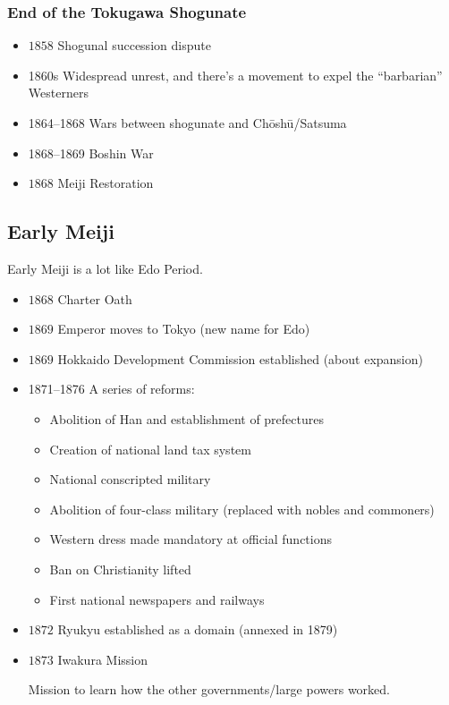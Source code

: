 \documentclass[class=article, crop=false]{standalone}
\begin{document}
  \subsubsection{End of the Tokugawa Shogunate}
  \begin{itemize}
    \item $1858$ Shogunal succession dispute
    \item 1860s Widespread unrest, and there's a movement to expel the ``barbarian'' Westerners
    \item 1864--1868 Wars between shogunate and Ch\=osh\=u/Satsuma
    \item 1868--1869 Boshin War
    \item $1868$ Meiji Restoration
  \end{itemize}
  \subsection{Early Meiji}
  \begin{note}{}
    Early Meiji is a lot like Edo Period.
  \end{note}
  \begin{itemize}
    \item $1868$ Charter Oath
    \item $1869$ Emperor moves to Tokyo (new name for Edo)
    \item $1869$ Hokkaido Development Commission established (about expansion)
    \item 1871--1876 A series of reforms:
    \begin{itemize}
      \item Abolition of Han and establishment of prefectures
      \item Creation of national land tax system
      \item National conscripted military
      \item Abolition of four-class military (replaced with nobles and commoners)
      \item Western dress made mandatory at official functions
      \item Ban on Christianity lifted
      \item First national newspapers and railways
    \end{itemize}
    \item $1872$ Ryukyu established as a domain (annexed in 1879)
    \item $1873$ Iwakura Mission
    \begin{note}{}
      Mission to learn how the other governments/large powers worked.
    \end{note}
  \end{itemize}
\end{document}
